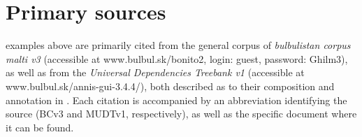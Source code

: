 \documentclass[output=paper]{langsci/langscibook}
\begin{document}

\section*{Primary sources}
 examples above are primarily cited from the general corpus of  \textit{bulbulistan corpus malti v3} (accessible at www.bulbul.sk/bonito2, login: guest, password: Ghilm3), as well as from the \textit{ Universal Dependencies Treebank v1} (accessible at www.bulbul.sk/annis-gui-3.4.4/), both described as to their composition and annotation in \cite{bulbul2018}. Each citation is accompanied by an abbreviation identifying the source (BCv3 and MUDTv1, respectively), as well as the specific document where it can be found.

\sloppy
\printbibliography[heading=subbibliography,notkeyword=this]
\end{document}
